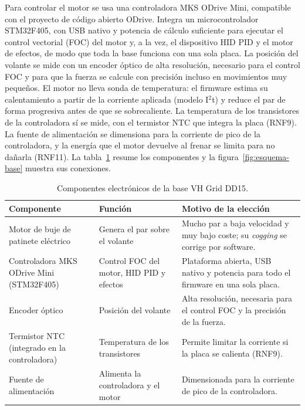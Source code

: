 Para controlar el motor se usa una controladora MKS ODrive Mini, compatible con el proyecto de código abierto ODrive. Integra un microcontrolador STM32F405, con USB nativo y potencia de cálculo suficiente para ejecutar el control vectorial (FOC) del motor y, a la vez, el dispositivo HID PID y el motor de efectos, de modo que toda la base funciona con una sola placa. La posición del volante se mide con un encoder óptico de alta resolución, necesario para el control FOC y para que la fuerza se calcule con precisión incluso en movimientos muy pequeños. El motor no lleva sonda de temperatura: el firmware estima su calentamiento a partir de la corriente aplicada (modelo I$^2$t) y reduce el par de forma progresiva antes de que se sobrecaliente. La temperatura de los transistores de la controladora sí se mide, con el termistor NTC que integra la placa (RNF9). La fuente de alimentación se dimensiona para la corriente de pico de la controladora, y la energía que el motor devuelve al frenar se limita para no dañarla (RNF11). La tabla~\ref{tab:componentes-base} resume los componentes y la figura~\ref{fig:esquema-base} muestra sus conexiones.

\begin{table}[H]
	\centering
	\caption{Componentes electrónicos de la base VH Grid DD15.}
	\label{tab:componentes-base}
	\small
	\begin{tabularx}{\textwidth}{@{}>{\raggedright\arraybackslash}p{3.2cm}>{\raggedright\arraybackslash}p{3.6cm}X@{}}
		\toprule
		\textbf{Componente} & \textbf{Función} & \textbf{Motivo de la elección} \\
		\midrule
		Motor de buje de patinete eléctrico & Genera el par sobre el volante & Mucho par a baja velocidad y muy bajo coste; su \textit{cogging} se corrige por software. \\
		Controladora MKS ODrive Mini (STM32F405) & Control FOC del motor, HID PID y efectos & Plataforma abierta, USB nativo y potencia para todo el firmware en una sola placa. \\
		Encoder óptico & Posición del volante & Alta resolución, necesaria para el control FOC y la precisión de la fuerza. \\
		Termistor NTC (integrado en la controladora) & Temperatura de los transistores & Permite limitar la corriente si la placa se calienta (RNF9). \\
		Fuente de alimentación & Alimenta la controladora y el motor & Dimensionada para la corriente de pico de la controladora. \\
		\bottomrule
	\end{tabularx}
\end{table}

